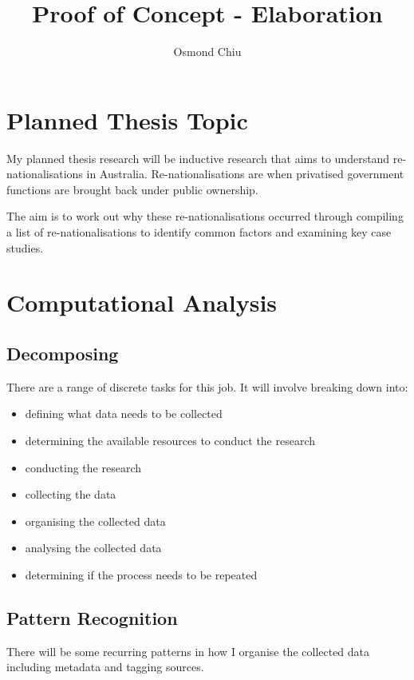 \documentclass{article}
\title{Proof of Concept - Elaboration}
\author{Osmond Chiu}
\begin{document}
\maketitle
\section*{Planned Thesis Topic}

My planned thesis research will be inductive research that aims to understand re-nationalisations in Australia. Re-nationalisations are when privatised government functions are brought back under public ownership.\par
The aim is to work out why these re-nationalisations occurred through compiling a list of re-nationalisations to identify common factors and examining key case studies.

\section*{Computational Analysis}
\subsection*{Decomposing}
There are a range of discrete tasks for this job. It will involve breaking down into:
\begin{itemize}
    \item defining what data needs to be collected
    \item determining the available resources to conduct the research
    \item conducting the research
    \item collecting the data
    \item organising the collected data
    \item analysing the collected data
    \item determining if the process needs to be repeated
\end{itemize}

\subsection*{Pattern Recognition}
There will be some recurring patterns in how I organise the collected data including metadata and tagging sources.\par
\end{document}
